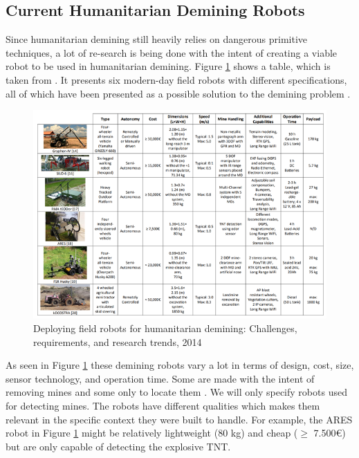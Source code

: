 \subsection{Current Humanitarian Demining Robots}

Since humanitarian demining still heavily relies on dangerous primitive techniques, a lot of re-search is being done with the intent of creating a viable robot to be used in humanitarian demining. Figure \ref{fig:field_robots_for_humanitarian_demining_2014} shows a table, which is taken from \cite{FieldRobots2014}. It presents six modern-day field robots with different specifications, all of which have been presented as a possible solution to the demining problem \cite{FieldRobots2014}.

\begin{figure}[ht]
  \centering
      \includegraphics[width=1\textwidth]{00 - Images/field_robots_for_humanitarian_demining_2014.png}
  \caption{Deploying field robots for humanitarian demining: Challenges, requirements, and research trends, 2014 \cite{FieldRobots2014}}
  \label{fig:field_robots_for_humanitarian_demining_2014}
\end{figure} 

As seen in Figure \ref{fig:field_robots_for_humanitarian_demining_2014} these demining robots vary a lot in terms of design, cost, size, sensor technology, and operation time. Some are made with the intent of removing mines and some only to locate them \cite{FieldRobots2014}. We will only specify robots used for detecting mines. The robots have different qualities which makes them relevant in the specific context they were built to handle. For example, the ARES robot in Figure \ref{fig:field_robots_for_humanitarian_demining_2014} might be relatively lightweight (80 kg) and cheap ($\ge$ 7.500€) but are only capable of detecting the explosive TNT.\\


